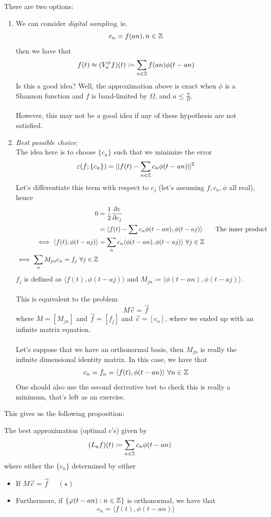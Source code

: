 \documentclass{article}
\begin{document}
There are two options:
\begin{enumerate}
    \item We can consider \textit{digital sampling}, ie.
    \[c_n = f(an), n \in \mathbb{Z}\]
    then we have that
    \[f(t) \approx (V_a^\phi f)(t) \coloneqq \sum_{n \in \mathbb{Z}} f(an)\phi(t - an)\]
    Is this a good idea? Well, the approximation above is exact when $\phi$ is a Shannon function and $f$ is band-limited by $\Omega$, and $a \leq \frac{\pi}{\Omega}$.\\\\
    However, this may not be a good idea if any of these hypothesis are not satisfied.
    \item \textit{Best possible choice}:\\
    The idea here is to choose $\{c_n\}$ such that we minimize the error
    \[\varepsilon(f; \{c_n\}) = ||f(t) - \sum_{n \in \mathbb{Z}} c_n \phi(t - an)||^2\]
    Let's differentiate this term with respect to $c_j$ (let's assuming $f, c_n, \phi$ all real), hence
    \begin{align*}
        0 &= \frac{1}{2} \frac{\partial \varepsilon}{\partial c_j}\\
        &= \langle f(t) - \sum c_n \phi(t - an), \phi(t - aj) \rangle \tag*{The inner product}\\
        \iff \langle f(t), \phi(t - aj)\rangle &= \sum_{n} c_n \langle \phi(t - an), \phi(t - aj) \rangle\ \forall j \in \mathbb{Z}\\
        \iff \sum_n M_{jn} c_n = f_j\ \forall j \in \mathbb{Z}
    \end{align*}
    $f_j$ is defined as $\langle f(t), \phi(t - aj)\rangle $ and $M_{jn} \coloneqq \langle \phi(t - an), \phi(t - aj) \rangle$.\\\\
    This is equivalent to the problem
    \[M \Vec{c} = \Vec{f}\]
    where $M = [M_{jn}]$ and $\Vec{f} = [f_j]$ and $\Vec{c} = [c_n]$, where we ended up with an infinite matrix equation.\\\\
    Let's suppose that we have an orthonormal basis, then $M_{jn}$ is really the infinite dimensional identity matrix. In this case, we have that
    \[c_n = f_n = \langle f(t), \phi(t - an) \rangle\ \forall n \in \mathbb{Z}\]
    One should also use the second derivative test to check this is really a minimum, that's left as an exercise.  
\end{enumerate}

This gives us the following proposition:
\begin{proposition}
    The best approximation (optimal $c$'s) given by
    \[(L_a f)(t) \coloneqq \sum_{n \in \mathbb{Z}} c_n \phi(t - an)\]
    where either the $\{c_n\}$ determined by either
    \begin{itemize}
        \item If $M \Vec{c} = \Vec{f}$ $\quad (\star)$
        \item Furthermore, if $\{\varphi(t - an): n \in \mathbb{Z}\}$ is orthonormal, we have that
        \[c_n = \langle f(t), \phi(t - an) \rangle \]
    \end{itemize}
\end{proposition}
\end{document}
